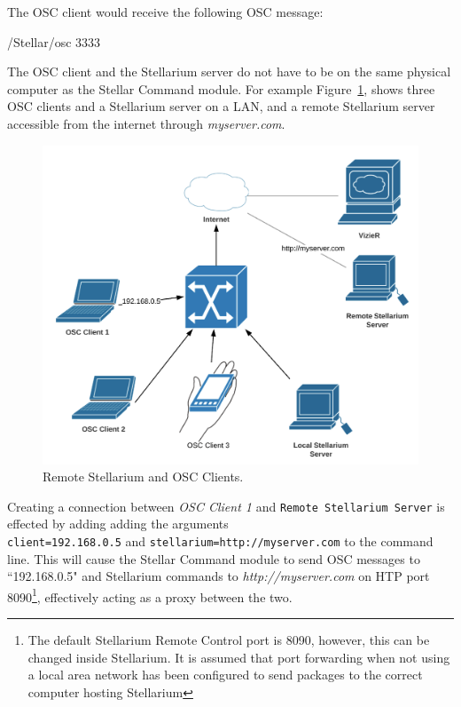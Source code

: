 \documentclass[10pt,a4paper,extrafontsizes]{memoir}
\begin{document}
   The OSC client would receive the following OSC message:
   \begin{syntax}

   	/Stellar/osc 3333  \\
   \end{syntax}
   \bigskip
   
The OSC client and the Stellarium server do not have to be on the same physical computer as the Stellar Command module. For example Figure~\ref{fig:RemoteStellarium}, shows three OSC clients and a Stellarium server on a LAN, and a remote Stellarium server accessible from the internet through \textit{myserver.com}. 

\begin{figure}[htbp]
	\centering
	\includegraphics[width=1\columnwidth]{RemoteStellarium}
	\caption{Remote Stellarium and OSC Clients.}
	\label{fig:RemoteStellarium}
\end{figure}
\bigskip

Creating a connection between \textit{OSC Client 1} and \texttt{Remote Stellarium Server} is effected by adding adding the arguments \\\texttt{client=192.168.0.5} and \texttt{stellarium=http://myserver.com} to the command line.
This will cause the Stellar Command module to send OSC messages to ``192.168.0.5" and Stellarium commands to \textit{http://myserver.com} on HTP port 8090\footnote{The default Stellarium Remote Control port is 8090, however, this can be changed inside Stellarium. It is assumed that port forwarding when not using a local area network has been configured to send packages to the correct computer hosting Stellarium}, effectively acting as a proxy between the two.
\end{document}
